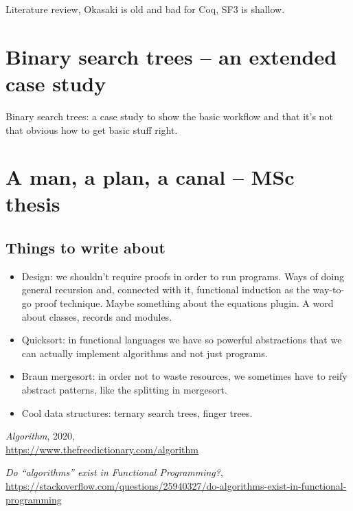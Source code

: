 \documentclass[declaration,mgr,english,shortabstract]{iithesis}
\begin{document}
Literature review, Okasaki is old and bad for Coq, SF3 is shallow.

\chapter{Binary search trees -- an extended case study} \label{ch2}

Binary search trees: a case study to show the basic workflow and that it's not that obvious how to get basic stuff right.

\chapter{A man, a plan, a canal -- MSc thesis}

\section{Things to write about}
\begin{itemize}
    \item Design: we shouldn't require proofs in order to run programs. Ways of doing general recursion and, connected with it, functional induction as the way-to-go proof technique. Maybe something about the equations plugin. A word about classes, records and modules.
    \item Quicksort: in functional languages we have so powerful abstractions that we can actually implement \*algorithms\* and not just programs.
    \item  Braun mergesort: in order not to waste resources, we sometimes have to reify abstract patterns, like the splitting in mergesort.
    \item Cool data structures: ternary search trees, finger trees.
\end{itemize}


\begin{thebibliography}{1}

    \textit{Algorithm}, 2020, \\
    \url{https://www.thefreedictionary.com/algorithm}

    \textit{Do ``algorithms'' exist in Functional Programming?}, \\
    \url{https://stackoverflow.com/questions/25940327/do-algorithms-exist-in-functional-programming}

\end{thebibliography}
\end{document}
